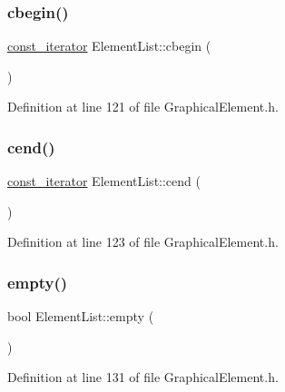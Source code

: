\subsubsection{\texorpdfstring{cbegin()}{cbegin()}}
{\footnotesize\ttfamily \hyperlink{class_element_list_a4323074a8e979322c0bf1eed5c892cf4}{const\+\_\+iterator} Element\+List\+::cbegin (\begin{DoxyParamCaption}{ }\end{DoxyParamCaption})\hspace{0.3cm}{\ttfamily [inline]}}



Definition at line 121 of file Graphical\+Element.\+h.

\mbox{\label{class_element_list_a67ed451811a28e5d94edd286b8a1f245}} 
\subsubsection{\texorpdfstring{cend()}{cend()}}
{\footnotesize\ttfamily \hyperlink{class_element_list_a4323074a8e979322c0bf1eed5c892cf4}{const\+\_\+iterator} Element\+List\+::cend (\begin{DoxyParamCaption}{ }\end{DoxyParamCaption})\hspace{0.3cm}{\ttfamily [inline]}}



Definition at line 123 of file Graphical\+Element.\+h.

\mbox{\label{class_element_list_aff93ee82e54aa171e792b0a86cafd08a}} 
\subsubsection{\texorpdfstring{empty()}{empty()}}
{\footnotesize\ttfamily bool Element\+List\+::empty (\begin{DoxyParamCaption}{ }\end{DoxyParamCaption})\hspace{0.3cm}{\ttfamily [inline]}}



Definition at line 131 of file Graphical\+Element.\+h.

